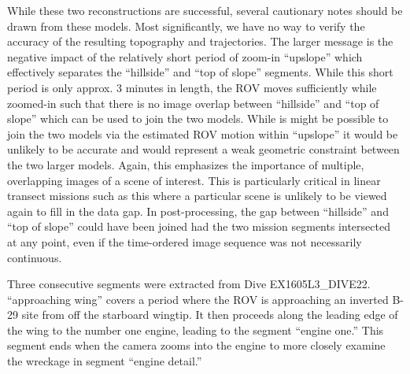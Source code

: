 \documentclass[letterpaper,12pt]{article}
\begin{document}
While these two reconstructions are successful, several cautionary notes should be drawn from these models.   Most significantly, we have no way to verify the accuracy of the resulting topography and trajectories.    The larger message is the negative impact of the relatively short period of zoom-in ``upslope'' which effectively separates the ``hillside'' and ``top of slope'' segments.  While this short period is only approx. 3 minutes in length, the ROV moves sufficiently while zoomed-in such that there is no image overlap between ``hillside'' and ``top of slope'' which can be used to join the two models.  While is might be possible to join the two models via the estimated ROV motion within ``upslope'' it would be unlikely to be accurate and would represent a weak geometric constraint between the two larger models.   Again, this emphasizes the importance of multiple, overlapping images of a scene of interest.  This is particularly critical in linear transect missions such as this where a particular scene is unlikely to be viewed again to fill in the data gap.    In post-processing, the gap between ``hillside'' and ``top of slope'' could have been joined had the two mission segments intersected at any point, even if the time-ordered image sequence was not necessarily continuous.

\clearpage

Three consecutive segments were extracted from Dive EX1605L3\_DIVE22. ``approaching wing'' covers a period where the ROV is approaching an inverted B-29 site from off the starboard wingtip.  It then proceeds along the leading edge of the wing to the number one engine, leading to the segment ``engine one.''  This segment ends when the camera zooms into the engine to more closely examine the wreckage in segment ``engine detail.''
\end{document}
